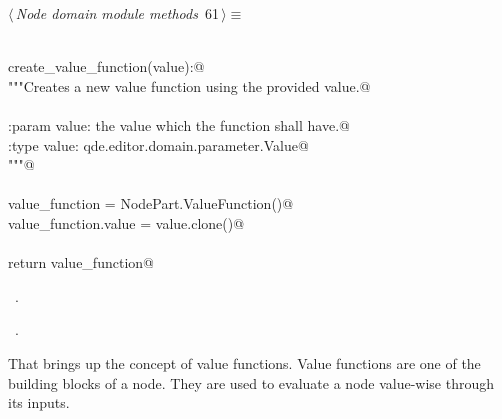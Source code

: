 \documentclass[
    a4paper,      %
    10pt,         %
    openright,    %
    notitlepage,  %
    parskip=half, %
]{scrreprt}       %
\theoremstyle{definition}                    %
\begin{document}
\begin{flushleft} \small
\begin{minipage}{\linewidth}\label{scrap103}\raggedright\small
{} $\langle\,${\itshape Node domain module methods}\nobreak\ {\footnotesize {61}}$\,\rangle\equiv$
\vspace{-1exm}
\begin{list}{}{} \item
\mbox{}\lstinline@@\\
\mbox{}\lstinline@def create_value_function(value):@\\
\mbox{}\lstinline@    """Creates a new value function using the provided value.@\\
\mbox{}\lstinline@@\\
\mbox{}\lstinline@    :param value: the value which the function shall have.@\\
\mbox{}\lstinline@    :type  value: qde.editor.domain.parameter.Value@\\
\mbox{}\lstinline@    """@\\
\mbox{}\lstinline@@\\
\mbox{}\lstinline@    value_function = NodePart.ValueFunction()@\\
\mbox{}\lstinline@    value_function.value = value.clone()@\\
\mbox{}\lstinline@@\\
\mbox{}\lstinline@    return value_function@\\
\mbox{}\lstinline@@{\NWsep}
\end{list}
\vspace{-1.5ex}
\footnotesize
\begin{list}{}{\setlength{\itemsep}{-\parsep}\setlength{\itemindent}{-\leftmargin}}
\item \NWtxtMacroDefBy\ .
\item \NWtxtMacroRefIn\ .

\item{}
\end{list}
\end{minipage}\vspace{4ex}
\end{flushleft}
That brings up the concept of value functions. Value functions are one of the
building blocks of a node. They are used to evaluate a node value-wise through
its inputs.
\end{document}
